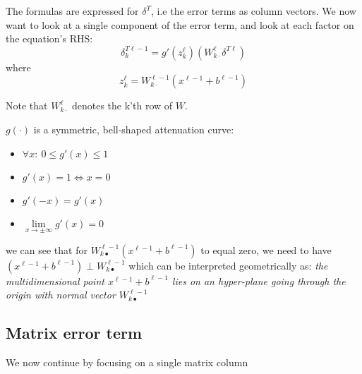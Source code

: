 \documentclass[]{article}
\begin{document}
 		The formulas are expressed for $\delta^T$, i.e the error terms as column vectors.
 		We now want to look at a single component of the error term, and look at each factor on the equation's RHS:
 		 	$$ \delta^{T\ell-1}_k = g'(z^{\ell}_k) (W^{\ell}_{k\cdot}\delta^{T\ell})$$
 		 where
 		 	$$z_k^\ell=W^{\ell-1}_{k\cdot}(x^{\ell-1}+b^{\ell-1})$$
 		 	
 		 Note that $W^{\ell}_{k\cdot}$ denotes the k'th row of $W$.
 		

		$g(\cdot)$ is a symmetric, bell-shaped attenuation curve:
		\begin{itemize}
			\item $\forall x:\ 0 \le g'(x) \le 1$
			\item $g'(x)=1 \Leftrightarrow x=0$
			\item $g'(-x) = g'(x)$
			\item $\lim\limits_{x \to \pm \infty}g'(x) = 0$
		\end{itemize} 
 		 we can see that for $W^{\ell-1}_{k\bullet}(x^{\ell-1}+b^{\ell-1})$ to equal zero, we need to have $(x^{\ell-1}+b^{\ell-1}) \perp W^{\ell-1}_{k\bullet}$ which can be interpreted geometrically as: \textit{the multidimensional point $x^{\ell-1}+b^{\ell-1}$ lies on an hyper-plane going through the origin with normal vector $W^{\ell-1}_{k\bullet}$ }
  	\subsection{Matrix error term}
  		We now continue by focusing on a single matrix column
 		 
 		 
 
\end{document}
